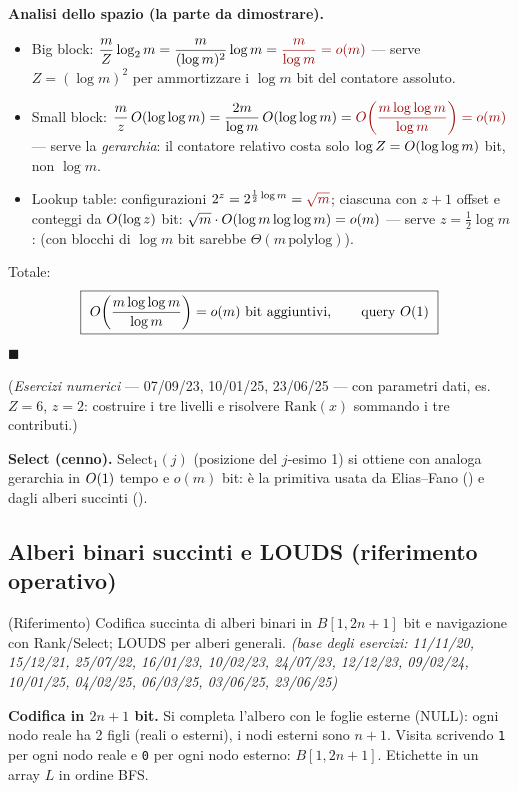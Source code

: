 \textbf{Analisi dello spazio (la parte da dimostrare).}
\begin{itemize}[leftmargin=1.6em,itemsep=2pt]
\item Big block: $\dfrac{m}{Z}\log_2 m=\dfrac{m}{(\log m)^2}\log m=\kw{\dfrac{m}{\log m}=o(m)}$
--- serve $Z=(\log m)^2$ per ammortizzare i $\log m$ bit del contatore assoluto.
\item Small block: $\dfrac{m}{z}\,\OO{\log\log m}=\dfrac{2m}{\log m}\,\OO{\log\log m}
=\kw{\OO{\dfrac{m\log\log m}{\log m}}=o(m)}$ --- serve la \emph{gerarchia}: il contatore relativo
costa solo $\log Z=O\!\left(\log\log m\right)$ bit, non $\log m$.
\item Lookup table: configurazioni $2^{z}=2^{\frac12\log m}=\kw{\sqrt{m}}$; ciascuna con $z+1$
offset e conteggi da $O\!\left(\log z\right)$ bit: $\sqrt{m}\cdot O\!\left(\log m\log\log m\right)=o(m)$ --- serve
$z=\frac12\log m$:  (con blocchi di
$\log m$ bit sarebbe $\Theta(m\,\mathrm{polylog})$).
\end{itemize}
Totale:
\[
\boxed{\ O\!\left(\frac{m\log\log m}{\log m}\right)=o(m)\ \text{bit aggiuntivi},\qquad
\text{query }O\!\left(1\right)\ }
\]
$\blacksquare$

(\emph{Esercizi numerici} --- 07/09/23, 10/01/25, 23/06/25 --- con parametri dati, es.\ $Z=6$,
$z=2$: costruire i tre livelli e risolvere $\mathrm{Rank}(x)$ sommando i tre contributi.)

\textbf{Select (cenno).} $\mathrm{Select}_1(j)$ (posizione del $j$-esimo 1) si ottiene con analoga
gerarchia in $O\!\left(1\right)$ tempo e $o(m)$ bit: \`e la primitiva usata da Elias--Fano () e
dagli alberi succinti ().

\subsection*{ Alberi binari succinti e LOUDS (riferimento operativo)}

\begin{domanda}
(Riferimento) Codifica succinta di alberi binari in $B[1,2n+1]$ bit e navigazione con
Rank/Select; LOUDS per alberi generali. \emph{(base degli esercizi: 11/11/20, 15/12/21, 25/07/22,
16/01/23, 10/02/23, 24/07/23, 12/12/23, 09/02/24, 10/01/25, 04/02/25, 06/03/25, 03/06/25,
23/06/25)}
\end{domanda}

\textbf{Codifica in $2n+1$ bit.} Si completa l'albero con le foglie esterne (NULL): ogni nodo
reale ha 2 figli (reali o esterni), i nodi esterni sono $n+1$. Visita 
scrivendo \texttt{1} per ogni nodo reale e \texttt{0} per ogni nodo esterno: $B[1,2n+1]$.
Etichette in un array $L$ in ordine BFS.

